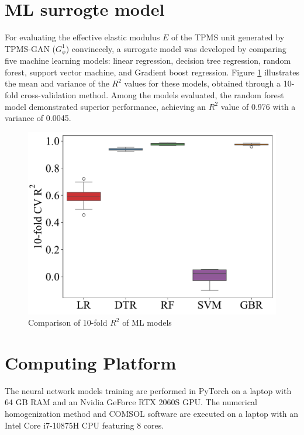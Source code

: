 \documentclass[preprint,review,12pt,authoryear]{elsarticle}
\begin{document}
\section{ML surrogte model}

For evaluating the effective elastic modulus \(E\) of the TPMS unit generated by TPMS-GAN (\(G_\phi^1\)) convinecely, a surrogate model was developed by comparing five machine learning models: linear regression, decision tree regression, random forest, support vector machine, and Gradient boost regression. Figure \ref{fig:s3} illustrates the mean and variance of the \(R^2\) values for these models, obtained through a 10-fold cross-validation method. Among the models evaluated, the random forest model demonstrated superior performance, achieving an \(R^2\) value of 0.976 with a variance of 0.0045.

\begin{figure}
    \centering
    \includegraphics[width=0.5\linewidth]{figures/S3.pdf}
    \caption{Comparison of 10-fold $R^2$ of ML models}
    \label{fig:s3}
\end{figure}

\section{Computing Platform}
The neural network models training are performed in PyTorch on a laptop with 64 GB RAM and an Nvidia GeForce RTX 2060S GPU. The numerical homogenization method and COMSOL software are executed on a laptop with an Intel Core i7-10875H CPU featuring 8 cores.

 






\end{document}
